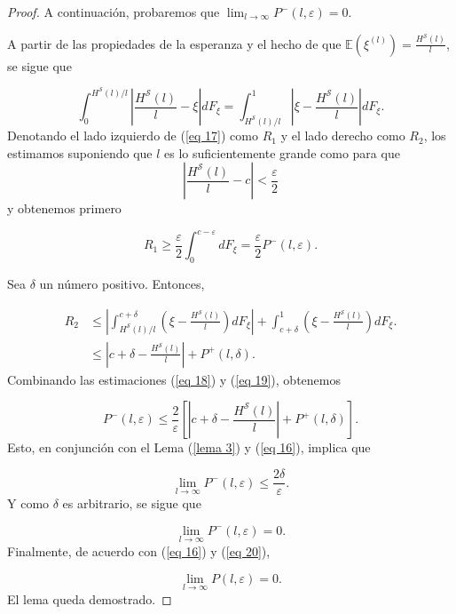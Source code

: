\documentclass{report}
\begin{document}
\begin{proof}
    A continuación, probaremos que \( \lim_{l \to \infty} P^-(l, \varepsilon) = 0\).\newline
    
    A partir de las propiedades de la esperanza y el hecho de que \( \mathbb{E} (\xi^{(l)}) = \frac{H^{\mathcal{S}}(l)}{l} \), se sigue que

    \begin{equation}\label{eq 17}
    \int_{0}^{H^{\mathcal{S}}(l)/l} \left| \frac{H^{\mathcal{S}}(l)}{l} - \xi \right| dF_{\xi} =
    \int_{H^{\mathcal{S}}(l)/l}^{1} \left| \xi - \frac{H^{\mathcal{S}}(l)}{l} \right| dF_{\xi}.
    \end{equation}
    Denotando el lado izquierdo de (\ref{eq 17}) como \( R_1 \) y el lado derecho como \( R_2 \), 
    los estimamos suponiendo que \( l \) es lo suficientemente grande como para que 
    \[
    \left| \frac{H^{\mathcal{S}}(l)}{l} - c \right| < \frac{\varepsilon}{2}
    \]
    y obtenemos primero
    
    \begin{equation}\label{eq 18}
    R_1 \geq \frac{\varepsilon}{2} \int_{0}^{c - \varepsilon} dF_{\xi} = \frac{\varepsilon}{2} P^-(l, \varepsilon).
    \end{equation}
    \bigskip

    Sea \( \delta \) un número positivo. Entonces,

    \begin{equation}\label{eq 19}
        \begin{aligned}
            R_2 & \leq \left| \int_{H^{\mathcal{S}}(l)/l}^{c + \delta} \left( \xi - \frac{H^{\mathcal{S}}(l)}{l} \right) dF_{\xi} \right|
            + \int_{c + \delta}^{1} \left( \xi - \frac{H^{\mathcal{S}}(l)}{l} \right) dF_{\xi}.\\
            & \leq \left| c + \delta - \frac{H^{\mathcal{S}}(l)}{l} \right| + P^+(l, \delta).
        \end{aligned}
    \end{equation}
    Combinando las estimaciones (\ref{eq 18}) y (\ref{eq 19}), obtenemos

    \begin{equation}
    P^-(l, \varepsilon) \leq \frac{2}{\varepsilon} \left[ \left| c + \delta - \frac{H^{\mathcal{S}}(l)}{l} \right| + P^+(l, \delta) \right].
    \end{equation}
    Esto, en conjunción con el Lema (\ref{lema 3}) y (\ref{eq 16}), implica que

    \begin{equation*}
    \lim_{l \to \infty} P^-(l, \varepsilon) \leq \frac{2\delta}{\varepsilon}.
    \end{equation*}
    Y como \( \delta \) es arbitrario, se sigue que

    \begin{equation}\label{eq 20}
    \lim_{l \to \infty} P^-(l, \varepsilon) = 0.
    \end{equation}
    Finalmente, de acuerdo con (\ref{eq 16}) y (\ref{eq 20}),

    \begin{equation*}
    \lim_{l \to \infty} P(l, \varepsilon) = 0.
    \end{equation*}
    El lema queda demostrado.
\end{proof}
\end{document}
